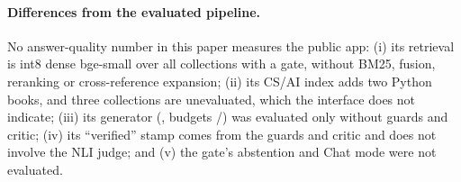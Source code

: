 \paragraph{Differences from the evaluated pipeline.}
No answer-quality number in this paper measures the public app:
(i) its retrieval is int8 dense bge-small over all collections with a gate, without BM25, fusion, reranking or cross-reference expansion;
(ii) its CS/AI index adds two Python books, and three collections are unevaluated, which the interface does not indicate;
(iii) its generator (\gptoss{}, budgets /) was evaluated only without guards and critic;
(iv) its ``verified'' stamp comes from the guards and critic and does not involve the NLI judge; and
(v) the gate's abstention and Chat mode were not evaluated.
